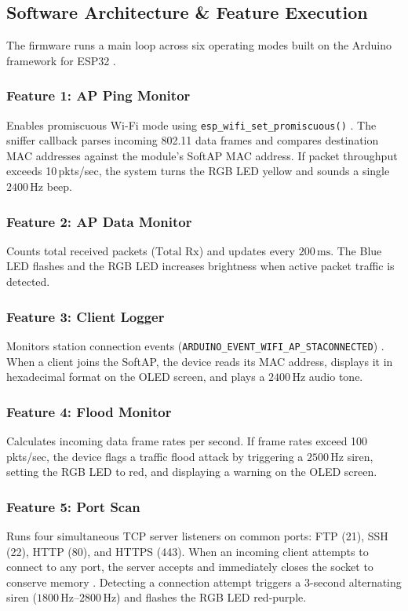\documentclass[conference]{IEEEtran}
\begin{document}
\subsection{Software Architecture \& Feature Execution}
The firmware runs a main loop across six operating modes built on the Arduino framework for ESP32 \cite{arduino_esp32}.

\subsubsection{Feature 1: AP Ping Monitor}
Enables promiscuous Wi-Fi mode using \texttt{esp\_wifi\_set\_promiscuous()} \cite{espressif_idf}. The sniffer callback parses incoming 802.11 data frames \cite{ieee80211} and compares destination MAC addresses against the module's SoftAP MAC address. If packet throughput exceeds 10\,pkts/sec, the system turns the RGB LED yellow and sounds a single $2400\,\text{Hz}$ beep.

\subsubsection{Feature 2: AP Data Monitor}
Counts total received packets ($\text{Total Rx}$) and updates every $200\,\text{ms}$. The Blue LED flashes and the RGB LED increases brightness when active packet traffic is detected.

\subsubsection{Feature 3: Client Logger}
Monitors station connection events (\texttt{ARDUINO\_EVENT\_WIFI\_AP\_STACONNECTED}) \cite{arduino_esp32}. When a client joins the SoftAP, the device reads its MAC address, displays it in hexadecimal format on the OLED screen, and plays a $2400\,\text{Hz}$ audio tone.

\subsubsection{Feature 4: Flood Monitor}
Calculates incoming data frame rates per second. If frame rates exceed 100\,pkts/sec, the device flags a traffic flood attack by triggering a $2500\,\text{Hz}$ siren, setting the RGB LED to red, and displaying a warning on the OLED screen.

\subsubsection{Feature 5: Port Scan}
Runs four simultaneous TCP server listeners on common ports: FTP (21), SSH (22), HTTP (80), and HTTPS (443). When an incoming client attempts to connect to any port, the server accepts and immediately closes the socket to conserve memory \cite{honeypot_iot}. Detecting a connection attempt triggers a 3-second alternating siren ($1800\,\text{Hz}$--$2800\,\text{Hz}$) and flashes the RGB LED red-purple.
\end{document}
